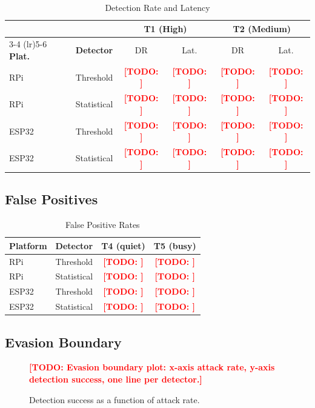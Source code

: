 \documentclass[conference]{IEEEtran}
\newcommand{\placeholder}[1]{\textcolor{red}{\textbf{[TODO: #1]}}}
\begin{document}
\begin{table}[htbp]
\caption{Detection Rate and Latency}
\label{tab:results_main}
\centering
\footnotesize
\begin{tabular}{@{}llcccc@{}}
\toprule
& & \multicolumn{2}{c}{\textbf{T1 (High)}} & \multicolumn{2}{c}{\textbf{T2 (Medium)}} \\
\cmidrule(lr){3-4} \cmidrule(lr){5-6}
\textbf{Plat.} & \textbf{Detector} & DR & Lat. & DR & Lat. \\
\midrule
RPi & Threshold & \placeholder{} & \placeholder{} & \placeholder{} & \placeholder{} \\
RPi & Statistical & \placeholder{} & \placeholder{} & \placeholder{} & \placeholder{} \\
ESP32 & Threshold & \placeholder{} & \placeholder{} & \placeholder{} & \placeholder{} \\
ESP32 & Statistical & \placeholder{} & \placeholder{} & \placeholder{} & \placeholder{} \\
\bottomrule
\end{tabular}
\end{table}

\subsection{False Positives}

\begin{table}[htbp]
\caption{False Positive Rates}
\label{tab:fp}
\centering
\small
\begin{tabular}{@{}llcc@{}}
\toprule
\textbf{Platform} & \textbf{Detector} & \textbf{T4 (quiet)} & \textbf{T5 (busy)} \\
\midrule
RPi & Threshold & \placeholder{} & \placeholder{} \\
RPi & Statistical & \placeholder{} & \placeholder{} \\
ESP32 & Threshold & \placeholder{} & \placeholder{} \\
ESP32 & Statistical & \placeholder{} & \placeholder{} \\
\bottomrule
\end{tabular}
\end{table}

\subsection{Evasion Boundary}

\begin{figure}[htbp]
\centering
\placeholder{Evasion boundary plot: x-axis attack rate, y-axis detection success, one line per detector.}
\caption{Detection success as a function of attack rate.}
\label{fig:evasion}
\end{figure}
\end{document}
